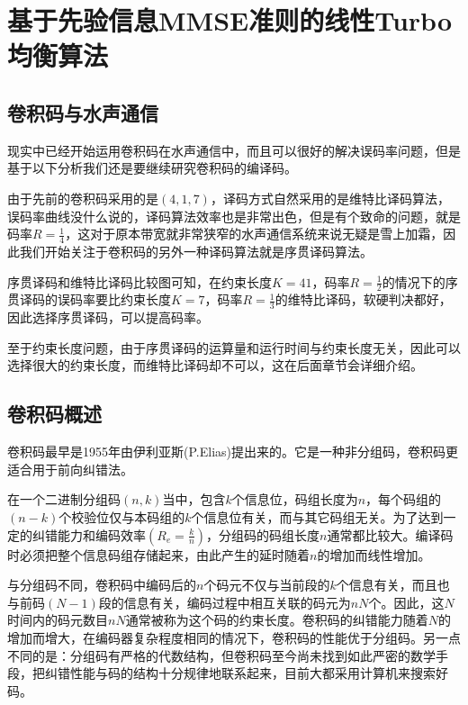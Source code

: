 %
\chapter{基于先验信息MMSE准则的线性Turbo均衡算法}
\thispagestyle{empty}
\section{卷积码与水声通信}
现实中已经开始运用卷积码在水声通信中，而且可以很好的解决误码率问题，但是基于以下分析我们还是要继续研究卷积码的编译码。

由于先前的卷积码采用的是$(4,1,7)$，译码方式自然采用的是维特比译码算法，误码率曲线没什么说的，译码算法效率也是非常出色，但是有个致命的问题，就是码率$R=\frac{1}{4}$，这对于原本带宽就非常狭窄的水声通信系统来说无疑是雪上加霜，因此我们开始关注于卷积码的另外一种译码算法就是序贯译码算法。

序贯译码和维特比译码比较图\cite{Digital_communications}可知，在约束长度$K=41$，码率$R=\frac{1}{2}$的情况下的序贯译码的误码率要比约束长度$K=7$，码率$R=\frac{1}{3}$的维特比译码，软硬判决都好，因此选择序贯译码，可以提高码率。

至于约束长度问题，由于序贯译码的运算量和运行时间与约束长度无关，因此可以选择很大的约束长度，而维特比译码却不可以，这在后面章节会详细介绍。
\section{卷积码概述}
卷积码最早是1955年由伊利亚斯(P.Elias)提出来的。它是一种非分组码，卷积码更适合用于前向纠错法。

在一个二进制分组码$(n,k)$当中，包含$k$个信息位，码组长度为$n$，每个码组的$(n-k)$个校验位仅与本码组的$k$个信息位有关，而与其它码组无关。为了达到一定的纠错能力和编码效率$(R_e=\frac{k}{n})$，分组码的码组长度$n$通常都比较大。编译码时必须把整个信息码组存储起来，由此产生的延时随着$n$的增加而线性增加。

与分组码不同，卷积码中编码后的$n$个码元不仅与当前段的$k$个信息有关，而且也与前码$(N-1)$段的信息有关，编码过程中相互关联的码元为$nN$个。因此，这$N$时间内的码元数目$nN$通常被称为这个码的约束长度。卷积码的纠错能力随着$N$的增加而增大，在编码器复杂程度相同的情况下，卷积码的性能优于分组码。另一点不同的是：分组码有严格的代数结构，但卷积码至今尚未找到如此严密的数学手段，把纠错性能与码的结构十分规律地联系起来，目前大都采用计算机来搜索好码。
